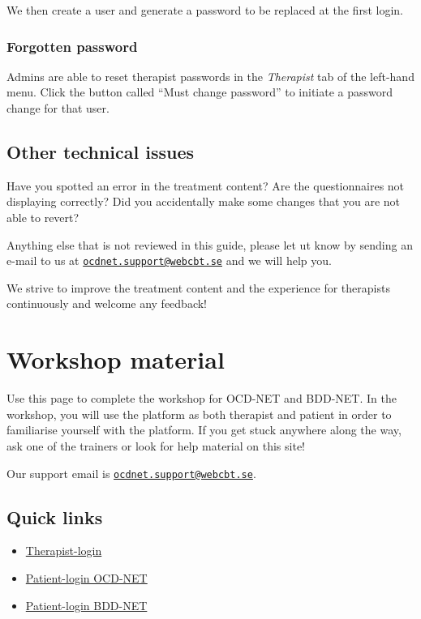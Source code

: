 \documentclass[]{book}
\providecommand{\tightlist}{%
  \setlength{\itemsep}{0pt}\setlength{\parskip}{0pt}}
\begin{document}
We then create a user and generate a password to be replaced at the first login.

\hypertarget{forgotten-password}{%
\subsection{Forgotten password}\label{forgotten-password}}

Admins are able to reset therapist passwords in the \emph{Therapist} tab of the left-hand menu. Click the button called ``Must change password'' to initiate a password change for that user.

\hypertarget{other-technical-issues}{%
\section{Other technical issues}\label{other-technical-issues}}

Have you spotted an error in the treatment content? Are the questionnaires not displaying correctly? Did you accidentally make some changes that you are not able to revert?

Anything else that is not reviewed in this guide, please let ut know by sending an e-mail to us at \href{mailto:ocdnet.support@webcbt.se}{\nolinkurl{ocdnet.support@webcbt.se}} and we will help you.

We strive to improve the treatment content and the experience for therapists continuously and welcome any feedback!

\hypertarget{workshop-material}{%
\chapter{Workshop material}\label{workshop-material}}

Use this page to complete the workshop for OCD-NET and BDD-NET. In the workshop, you will use the platform as both therapist and patient in order to familiarise yourself with the platform. If you get stuck anywhere along the way, ask one of the trainers or look for help material on this site!

Our support email is \href{mailto:ocdnet.support@webcbt.se}{\nolinkurl{ocdnet.support@webcbt.se}}.

\hypertarget{quick-links}{%
\section{Quick links}\label{quick-links}}

\begin{itemize}
\tightlist
\item
  \href{https://webcbt.se/ocdnet}{Therapist-login}\\
\item
  \href{https://ocdnet.webcbt.se}{Patient-login OCD-NET}\\
\item
  \href{https://bddnet.webcbt.se}{Patient-login BDD-NET}
\end{itemize}
\end{document}
